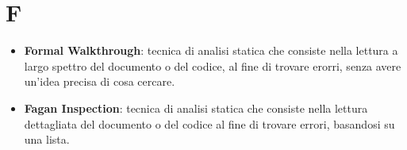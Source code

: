 \section{F}
\begin{itemize} 
	\item
 	\textbf{Formal Walkthrough}: tecnica di analisi statica che consiste nella lettura a largo spettro del documento o del codice, al fine di trovare erorri, senza avere un'idea precisa di cosa cercare.
 	\item
 	\textbf{Fagan Inspection}:  tecnica di analisi statica che consiste nella lettura dettagliata del documento o del codice al fine di trovare errori, basandosi su una lista.
\end{itemize}